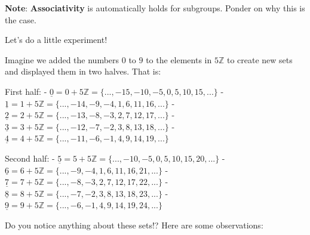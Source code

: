 \documentclass[11pt]{article}
\begin{document}
\textbf{Note}: \textbf{Associativity} is automatically holds for
subgroups. Ponder on why this is the case.

Let's do a little experiment!

Imagine we added the numbers \(0\) to \(9\) to the elements in
\(5\mathbb{Z}\) to create new sets and displayed them in two halves.
That is:

First half: -
\(\underline{0} = 0 + 5\mathbb{Z} = \lbrace..., -15, -10, -5, 0, 5, 10, 15,...\rbrace\)
-
\(\underline{1} = 1 + 5\mathbb{Z} = \{..., -14, -9, -4, 1, 6, 11, 16,...\}\)
-
\(\underline{2} = 2 + 5\mathbb{Z} = \{..., -13, -8, -3, 2, 7, 12, 17,...\}\)
-
\(\underline{3} = 3 + 5\mathbb{Z} = \{..., -12, -7, -2, 3, 8, 13, 18,...\}\)
-
\(\underline{4} = 4 + 5\mathbb{Z} = \{..., -11, -6, -1, 4, 9, 14, 19,...\}\)

Second half: -
\(\underline{5} = 5 + 5\mathbb{Z} = \{..., -10, -5, 0, 5, 10, 15, 20,...\}\)
-
\(\underline{6} = 6 + 5\mathbb{Z} = \{..., -9, -4, 1, 6, 11, 16, 21,...\}\)
-
\(\underline{7} = 7 + 5\mathbb{Z} = \{..., -8, -3, 2, 7, 12, 17, 22,...\}\)
-
\(\underline{8} = 8 + 5\mathbb{Z} = \{..., -7, -2, 3, 8, 13, 18, 23,...\}\)
-
\(\underline{9} = 9 + 5\mathbb{Z} = \{..., -6, -1, 4, 9, 14, 19, 24,...\}\)

Do you notice anything about these sets!? Here are some observations:
\end{document}
